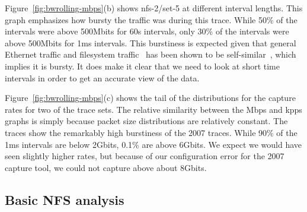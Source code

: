 Figure~\ref{fig:bwrolling-mbps}(b) shows nfs-2/set-5 at different
interval lengths.  This graph emphasizes how bursty the traffic was
during this trace. While 50\% of the intervals were above 500Mbits for
60s intervals, only 30\% of the intervals were above 500Mbits for 1ms
intervals.  This burstiness is expected given that
general Ethernet traffic and filesystem
traffic~\cite{Gribble98selfsimilar} has been shown to be
self-similar~\cite{Leland94selfsimilar}, which implies it is bursty.
It does make it clear that we need to look at short time intervals in
order to get an accurate view of the data.

Figure~\ref{fig:bwrolling-mbps}(c) shows the tail of the distributions for
the capture rates for two of the trace sets.  The relative similarity
between the Mbps and kpps graphs is simply because packet size
distributions are relatively constant.  The traces show the remarkably high
burstiness of the 2007 traces.  While 90\% of the 1ms intervals are
below 2Gbits, 0.1\% are above 6Gbits.  We expect we would have seen
slightly higher rates, but because of our configuration error for the
2007 capture tool, we could not capture above about 8Gbits.

\begin{figure*}
\caption{Bandwidth measured in the collection process.  In figure (c),
nfs-2/set-5 at different intervals is the top group of 4 lines, and
nfs-1/set-12 is the bottom group of 4 lines.  nfs-1/set-12 does not go
all the way to the right at 60s intervals because there were
insufficient data points for the 0.9999 quantile.}
\label{fig:bwrolling-mbps}
\end{figure*}


\subsection{Basic NFS analysis}


